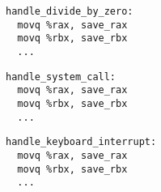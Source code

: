 

\ifdefined\codeBoxA\else\newsavebox\codeBoxA\fi
\begin{lrbox}{\codeBoxA}
\lstset{
    language=myasm,
    style=script,
}
\begin{lstlisting}
handle_divide_by_zero:
  movq %rax, save_rax
  movq %rbx, save_rbx
  ...
\end{lstlisting}
\end{lrbox}

\ifdefined\codeBoxB\else\newsavebox\codeBoxB\fi
\begin{lrbox}{\codeBoxB}
\lstset{
    language=myasm,
    style=script,
}
\begin{lstlisting}
handle_system_call:
  movq %rax, save_rax
  movq %rbx, save_rbx
  ...
\end{lstlisting}
\end{lrbox}

\ifdefined\codeBoxC\else\newsavebox\codeBoxC\fi
\begin{lrbox}{\codeBoxC}
\lstset{
    language=myasm,
    style=script,
}
\begin{lstlisting}
handle_keyboard_interrupt:
  movq %rax, save_rax
  movq %rbx, save_rbx
  ...
\end{lstlisting}
\end{lrbox}

